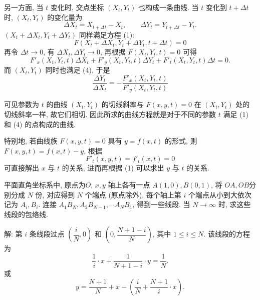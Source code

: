 另一方面, 当 $t$ 变化时, 交点坐标 $(X_t, Y_t)$ 也构成一条曲线. 当 $t$ 变化到 $t+\Delta t$ 时, $(X_t, Y_t)$ 的变化量为 
\[ \Delta X_t = X_{t+\Delta t} - X_t, \qquad \Delta Y_t =Y_{t+\Delta t} - Y_t .\]
$(X_t+\Delta X_t, Y_t+\Delta Y_t)$ 同样满足方程 (1): 
\[ F(X_t+\Delta X_t, Y_t+\Delta Y_t, t+\Delta t) = 0 \tag{6} \]
再令 $\Delta t \to 0$, 有 $\Delta X_t, \Delta Y_t\to 0$, 再根据 $F(X_t,Y_t,t)=0$ 可得
\[ F'_x(X_t, Y_t, t) \Delta X_t + F'_y(X_t, Y_t, t) \Delta Y_t +  F'_t(X_t, Y_t, t)\Delta t = 0.\]
而 $(X_t,Y_t)$ 同时也满足 (4), 于是
\[\frac{\Delta Y_t}{\Delta X_t} = -\frac{ F'_x(X_t,Y_t,t)}{ F'_y(X_t,Y_t,t)} \tag{7} \]

可见参数为 $t$ 的曲线 $(X_t, Y_t)$ 的切线斜率与 $F(x,y,t)=0$ 在 $(X_t, Y_t)$ 处的切线斜率一样, 故它们相切. 因此所求的曲线方程就是对于不同的参数 $t$ 满足 (1) 和 (4) 的点构成的曲线.

特别地, 若曲线族 $F(x,y,t)=0$ 具有 $y=f(x,t)$ 的形式, 则 $F(x,y,t)=f(x,t)-y$, 根据
\[ F'_t(x,y,t) = f'_t(x,t) = 0 \]
可直接解出 $x$ 与 $t$ 的关系, 进而再根据 (1) 可以求出 $y$ 与 $t$ 的关系.

\newpage

平面直角坐标系中, 原点为$O$, $x,y$ 轴上各有一点 $A(1,0), B(0,1)$, 将 $OA,OB$分别分成 $N$ 份, 对应得到 $N$ 个端点 (原点除外), 每个轴上第 $i$ 个端点从小到大依次记为 $A_i, B_i$. 连接 $A_1B_N, A_2B_{N-1}, \cdots A_NB_1$, 得到一些线段. 当 $N\to\infty$ 时, 求这些线段的包络线.
\begin{figure*}[htbp]
\centering
{}
\end{figure*}

解: 第 $i$ 条线段过点 $(\dfrac{i}{N}, 0)$ 和 $(0, \dfrac{N+1-i}{N})$, 其中 $1\le i\le N$. 该线段的方程为
\[\frac{1}{i}\cdot x + \frac{1}{N+1-i}\cdot y=\frac{1}{N}.\]
或
\[y=\frac{N+1}{N} + x - \left(\frac{i}{N} + \frac{N+1}{i}\cdot x\right).\]

